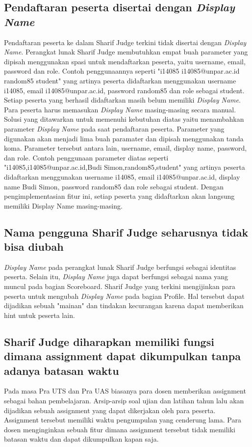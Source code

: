 \subsection{Pendaftaran peserta disertai dengan \textit{Display Name}}
Pendaftaran peserta ke dalam Sharif Judge terkini tidak disertai dengan \textit{Display Name}. Perangkat lunak Sharif Judge membutuhkan empat buah parameter yang dipisah menggunakan spasi untuk mendaftarkan peserta, yaitu username, email, password dan role. Contoh penggunaannya seperti "i14085 i14085@unpar.ac.id random85 student" yang artinya peserta didaftarkan menggunakan username i14085, email i14085@unpar.ac.id, password random85 dan role sebagai student. Setiap peserta yang berhasil didaftarkan masih belum memiliki \textit{Display Name}. Para peserta harus memasukan \textit{Display Name} masing-masing secara manual. \\
Solusi yang ditawarkan untuk memenuhi kebutuhan diatas yaitu menambahkan parameter \textit{Display Name} pada saat pendaftaran peserta. Parameter yang digunakan akan menjadi lima buah paramater dan dipisah menggunakan tanda koma. Parameter tersebut antara lain, username, email, display name, password, dan role. Contoh penggunaan parameter diatas seperti "i14085,i14085@unpar.ac.id,Budi Simon,random85,student" yang artinya peserta didaftarkan menggunakan username i14085, email i14085@unpar.ac.id, display name Budi Simon, password random85 dan role sebagai student. Dengan pengimplementasian fitur ini, setiap peserta yang didaftarkan akan langsung memiliki Display Name masing-masing.

\subsection{Nama pengguna Sharif Judge seharusnya tidak bisa diubah}
\textit{Display Name} pada perangkat lunak Sharif Judge berfungsi sebagai identitas peserta. Selain itu, \textit{Display Name} juga dapat berfungsi sebagai nama yang muncul pada bagian Scoreboard. Sharif Judge yang terkini mengijinkan para peserta untuk mengubah \textit{Display Name} pada bagian Profile. Hal tersebut dapat dijadikan sebuah "mainan" dan tindakan kecurangan karena dapat memberikan hint untuk peserta lain.

\subsection{Sharif Judge diharapkan memiliki fungsi dimana assignment dapat dikumpulkan tanpa adanya batasan waktu}
Pada masa Pra UTS dan Pra UAS biasanya para dosen memberikan assignment sebagai bahan pembelajaran. Arsip-arsip soal ujian dan latihan tahun lalu akan dijadikan sebuah assignment yang dapat dikerjakan oleh para peserta. Assignment tersebut memiliki waktu pengumpulan yang cenderung lama. Para dosen menginginkan sebuah fitur dimana assignment tersebut tidak memiliki batasan waktu dan dapat dikumpulkan kapan saja.

